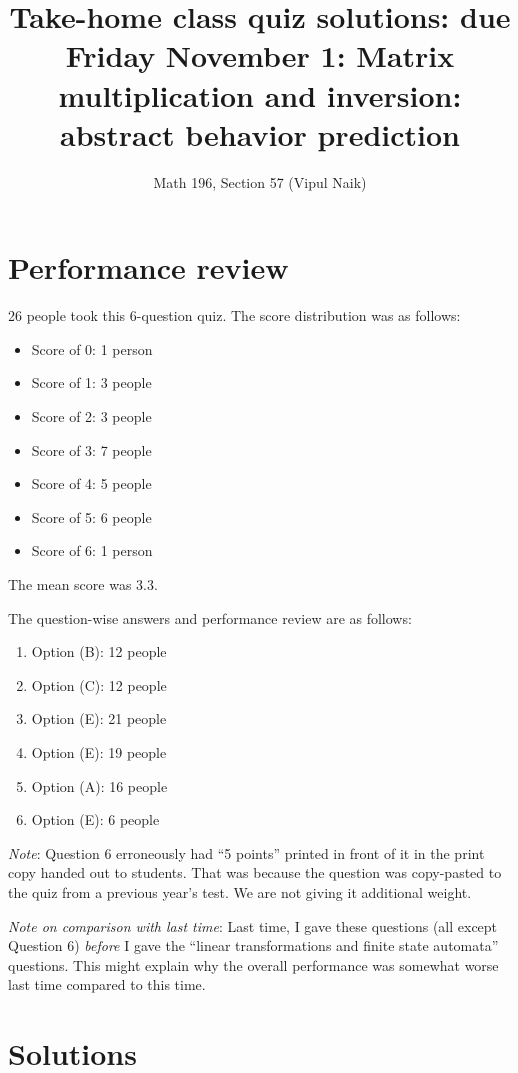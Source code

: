 \documentclass[10pt]{amsart}
\title{Take-home class quiz solutions: due Friday November 1: Matrix multiplication and inversion: abstract behavior prediction}
\author{Math 196, Section 57 (Vipul Naik)}
\begin{document}
\maketitle

\section{Performance review}

26 people took this 6-question quiz. The score distribution was as follows:

\begin{itemize}
\item Score of 0: 1 person
\item Score of 1: 3 people
\item Score of 2: 3 people
\item Score of 3: 7 people
\item Score of 4: 5 people
\item Score of 5: 6 people
\item Score of 6: 1 person
\end{itemize}

The mean score was 3.3.

The question-wise answers and performance review are as follows:

\begin{enumerate}
\item Option (B): 12 people
\item Option (C): 12 people
\item Option (E): 21 people
\item Option (E): 19 people
\item Option (A): 16 people
\item Option (E): 6 people
\end{enumerate}

{\em Note}: Question 6 erroneously had ``5 points'' printed in front
of it in the print copy handed out to students. That was because the
question was copy-pasted to the quiz from a previous year's test. We
are not giving it additional weight.

{\em Note on comparison with last time}: Last time, I gave these
questions (all except Question 6) {\em before} I gave the ``linear
transformations and finite state automata'' questions. This might
explain why the overall performance was somewhat worse last time
compared to this time.

\section{Solutions}
\end{document}
